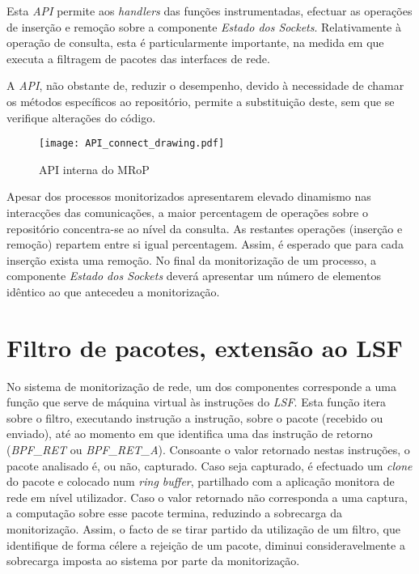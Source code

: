 Esta \textit{API} permite aos \textit{handlers} das funções instrumentadas, efectuar as operações de inserção e remoção sobre a componente \textit{Estado dos Sockets}.
Relativamente à operação de consulta, esta é particularmente importante, na medida em que executa a filtragem de pacotes das interfaces de rede.

A \textit{API}, não obstante de, reduzir o desempenho, devido à necessidade de chamar os métodos específicos ao repositório, permite a substituição deste, sem que se verifique alterações do código.

\begin{figure}[!htbp]
\centering
\texttt{[image: API\_connect\_drawing.pdf]}
\caption{API interna do MRoP}
\label{fig:api_connect}
\end{figure}

Apesar dos processos monitorizados apresentarem elevado dinamismo nas interacções das comunicações, a maior percentagem de operações sobre o repositório concentra-se ao nível da consulta.
As restantes operações (inserção e remoção) repartem entre si igual percentagem.
Assim, é esperado que para cada inserção exista uma remoção.
No final da monitorização de um processo, a componente \textit{Estado dos Sockets} deverá apresentar um número de elementos idêntico ao que antecedeu a monitorização.




\section{Filtro de pacotes, extensão ao LSF}

No sistema de monitorização de rede, um dos componentes corresponde a uma função que serve de máquina virtual às instruções do \textit{LSF}.
Esta função itera sobre o filtro, executando instrução a instrução, sobre o pacote (recebido ou enviado), até ao momento em que identifica uma das instrução de retorno (\textit{BPF\_RET} ou \textit{BPF\_RET\_A}).
Consoante o valor retornado nestas instruções, o pacote analisado é, ou não, capturado.
Caso seja capturado, é efectuado um \textit{clone} do pacote e colocado num \textit{ring buffer}, partilhado com a aplicação monitora de rede em nível utilizador.
Caso o valor retornado não corresponda a uma captura, a computação sobre esse pacote termina, reduzindo a sobrecarga da monitorização.
Assim, o facto de se tirar partido da utilização de um filtro, que identifique de forma célere a rejeição de um pacote, diminui consideravelmente a sobrecarga imposta ao sistema por parte da monitorização.

